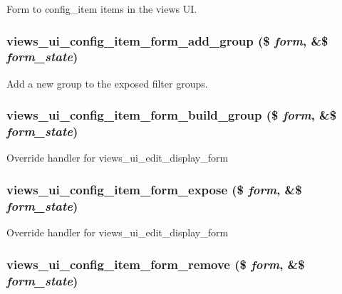 \label{admin_8inc_aaee6bed5581c5d6852139a0a9605bc39}
Form to config\_\-item items in the views UI. \hypertarget{admin_8inc_aeb1384000a460e3ff94fe2dd22339ff1}{
\subsubsection[{views\_\-ui\_\-config\_\-item\_\-form\_\-add\_\-group}]{\setlength{\rightskip}{0pt plus 5cm}views\_\-ui\_\-config\_\-item\_\-form\_\-add\_\-group (\$ {\em form}, \/  \&\$ {\em form\_\-state})}}
\label{admin_8inc_aeb1384000a460e3ff94fe2dd22339ff1}
Add a new group to the exposed filter groups. \hypertarget{admin_8inc_acc68238a1d6afd3c96bc9799b5c000a9}{
\subsubsection[{views\_\-ui\_\-config\_\-item\_\-form\_\-build\_\-group}]{\setlength{\rightskip}{0pt plus 5cm}views\_\-ui\_\-config\_\-item\_\-form\_\-build\_\-group (\$ {\em form}, \/  \&\$ {\em form\_\-state})}}
\label{admin_8inc_acc68238a1d6afd3c96bc9799b5c000a9}
Override handler for views\_\-ui\_\-edit\_\-display\_\-form \hypertarget{admin_8inc_a3a3a7734f5b034e63b7866c326c70229}{
\subsubsection[{views\_\-ui\_\-config\_\-item\_\-form\_\-expose}]{\setlength{\rightskip}{0pt plus 5cm}views\_\-ui\_\-config\_\-item\_\-form\_\-expose (\$ {\em form}, \/  \&\$ {\em form\_\-state})}}
\label{admin_8inc_a3a3a7734f5b034e63b7866c326c70229}
Override handler for views\_\-ui\_\-edit\_\-display\_\-form \hypertarget{admin_8inc_a7f602db6d4cc41b412a8ace2d6320ea8}{
\subsubsection[{views\_\-ui\_\-config\_\-item\_\-form\_\-remove}]{\setlength{\rightskip}{0pt plus 5cm}views\_\-ui\_\-config\_\-item\_\-form\_\-remove (\$ {\em form}, \/  \&\$ {\em form\_\-state})}}
